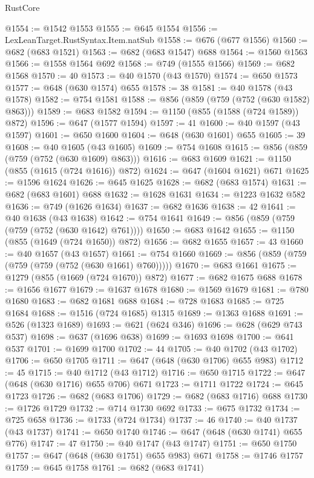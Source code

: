 \begin{lexlean}{RustCore}
\begin{coremodule}
@1554 := @1542 @1553
@1555 := @645 @1554
@1556 := LexLeanTarget.RustSyntax.Item.natSub
@1558 := @676 (@677 @1556)
@1560 := @682 (@683 @1521)
@1563 := @682 (@683 @1547) @688
@1564 := @1560 @1563
@1566 := @1558 @1564 @692
@1568 := @749 (@1555 @1566)
@1569 := @682 @1568
@1570 := 40
@1573 := @40 @1570 (@43 @1570)
@1574 := @650 @1573
@1577 := @648 (@630 @1574) @655
@1578 := 38
@1581 := @40 @1578 (@43 @1578)
@1582 := @754 @1581
@1588 := @856 (@859 (@759 (@752 (@630 @1582) @863)))
@1589 := @683 @1582
@1594 := @1150 (@855 (@1588 (@724 @1589)) @872)
@1596 := @647 (@1577 @1594)
@1597 := 41
@1600 := @40 @1597 (@43 @1597)
@1601 := @650 @1600
@1604 := @648 (@630 @1601) @655
@1605 := 39
@1608 := @40 @1605 (@43 @1605)
@1609 := @754 @1608
@1615 := @856 (@859 (@759 (@752 (@630 @1609) @863)))
@1616 := @683 @1609
@1621 := @1150 (@855 (@1615 (@724 @1616)) @872)
@1624 := @647 (@1604 @1621) @671
@1625 := @1596 @1624
@1626 := @645 @1625
@1628 := @682 (@683 @1574)
@1631 := @682 (@683 @1601) @688
@1632 := @1628 @1631
@1634 := @1223 @1632 @582
@1636 := @749 (@1626 @1634)
@1637 := @682 @1636
@1638 := 42
@1641 := @40 @1638 (@43 @1638)
@1642 := @754 @1641
@1649 := @856 (@859 (@759 (@759 (@752 (@630 @1642) @761))))
@1650 := @683 @1642
@1655 := @1150 (@855 (@1649 (@724 @1650)) @872)
@1656 := @682 @1655
@1657 := 43
@1660 := @40 @1657 (@43 @1657)
@1661 := @754 @1660
@1669 := @856 (@859 (@759 (@759 (@759 (@752 (@630 @1661) @760)))))
@1670 := @683 @1661
@1675 := @1279 (@855 (@1669 (@724 @1670)) @872)
@1677 := @682 @1675 @688
@1678 := @1656 @1677
@1679 := @1637 @1678
@1680 := @1569 @1679
@1681 := @780 @1680
@1683 := @682 @1681 @688
@1684 := @728 @1683
@1685 := @725 @1684
@1688 := @1516 (@724 @1685) @1315
@1689 := @1363 @1688
@1691 := @526 (@1323 @1689)
@1693 := @621 (@624 @346)
@1696 := @628 (@629 @743 @537)
@1698 := @637 (@1696 @638)
@1699 := @1693 @1698
@1700 := @641 @537
@1701 := @1699 @1700
@1702 := 44
@1705 := @40 @1702 (@43 @1702)
@1706 := @650 @1705
@1711 := @647 (@648 (@630 @1706) @655 @983)
@1712 := 45
@1715 := @40 @1712 (@43 @1712)
@1716 := @650 @1715
@1722 := @647 (@648 (@630 @1716) @655 @706) @671
@1723 := @1711 @1722
@1724 := @645 @1723
@1726 := @682 (@683 @1706)
@1729 := @682 (@683 @1716) @688
@1730 := @1726 @1729
@1732 := @714 @1730 @692
@1733 := @675 @1732
@1734 := @725 @658
@1736 := @1733 (@724 @1734)
@1737 := 46
@1740 := @40 @1737 (@43 @1737)
@1741 := @650 @1740
@1746 := @647 (@648 (@630 @1741) @655 @776)
@1747 := 47
@1750 := @40 @1747 (@43 @1747)
@1751 := @650 @1750
@1757 := @647 (@648 (@630 @1751) @655 @983) @671
@1758 := @1746 @1757
@1759 := @645 @1758
@1761 := @682 (@683 @1741)

\end{coremodule}
\end{lexlean}
